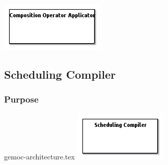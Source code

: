 \documentclass{gemoc} %
\begin{document}
\begin{center}
\includegraphics*[trim=0.0cm 0.0cm 0cm 0.0cm, clip=true]{../images/generated/Generated_Composition_Operator_Applicator.png}
\end{center}



\subsection{Scheduling Compiler}


\subsubsection{Purpose}

\begin{center}gemoc-architecture.tex
\includegraphics*[trim=0.0cm 0.0cm 0cm 0.0cm, clip=true]{../images/generated/Generated_Scheduling_Compiler.png}
\end{center}
\end{document}
